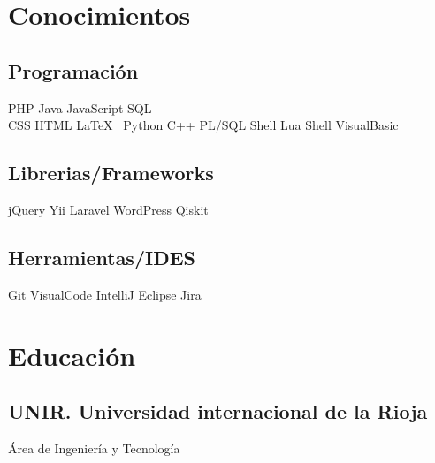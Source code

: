 	\hfill
	\begin{minipage}[t]{0.25\textwidth}


		\section{Conocimientos}

		\subsection{Programación}
		\sectionsep
		PHP \textbullet{} Java \textbullet{} JavaScript \textbullet{} SQL \\ \textbullet{} CSS \textbullet{} HTML \textbullet{} \LaTeX\
		Python \textbullet{} C++ \textbullet{} PL/SQL \textbullet{} Shell
		Lua \textbullet{} Shell \textbullet{} VisualBasic
		\sectionsep

		\subsection{Librerias/Frameworks}
		\sectionsep
		jQuery \textbullet{} Yii \textbullet{} Laravel \textbullet{} WordPress \textbullet{} Qiskit\\
		\sectionsep
		\sectionsep

		\subsection{Herramientas/IDES}
		\sectionsep
		Git \textbullet{} VisualCode \textbullet{} IntelliJ \textbullet{} Eclipse \textbullet{} Jira

		\sectionsep

		\section{Educación}

		\subsection{UNIR. Universidad internacional de la Rioja}
		Área de Ingeniería y Tecnología \\

		\sectionsep


\end{minipage}
